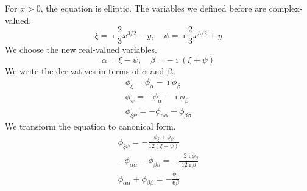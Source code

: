 {\begin{Solution}
\begin{enumerate}
    For $x > 0$, the equation is elliptic.  The variables we defined
    before are complex-valued.
    \[
    \xi = \imath \frac{2}{3} x^{3/2} - y, \quad
    \psi = \imath \frac{2}{3} x^{3/2} + y
    \]
    We choose the new real-valued variables.
    \[
    \alpha = \xi - \psi, \quad
    \beta = -\imath (\xi + \psi)
    \]
    We write the derivatives in terms of $\alpha$ and $\beta$.
    \begin{gather*}
      \phi_\xi = \phi_\alpha - \imath \phi_\beta 
      \\
      \phi_\psi = - \phi_\alpha - \imath \phi_\beta 
      \\
      \phi_{\xi \psi} = - \phi_{\alpha \alpha} - \phi_{\beta \beta}
    \end{gather*}
    We transform the equation to canonical form.
    \begin{gather*}
      \phi_{\xi \psi} = - \frac{ \phi_\xi + \phi_\psi }{ 12 (\xi + \psi) } 
      \\
      - \phi_{\alpha \alpha} - \phi_{\beta \beta} = - \frac{ - 2 \imath \phi_{\beta} }{ 12 \imath \beta } 
      \\
      \boxed{
        \phi_{\alpha \alpha} + \phi_{\beta \beta} = - \frac{ \phi_\beta }{ 6 \beta }
        }
    \end{gather*}
  \end{enumerate}
\end{Solution}




\raggedbottom
}
